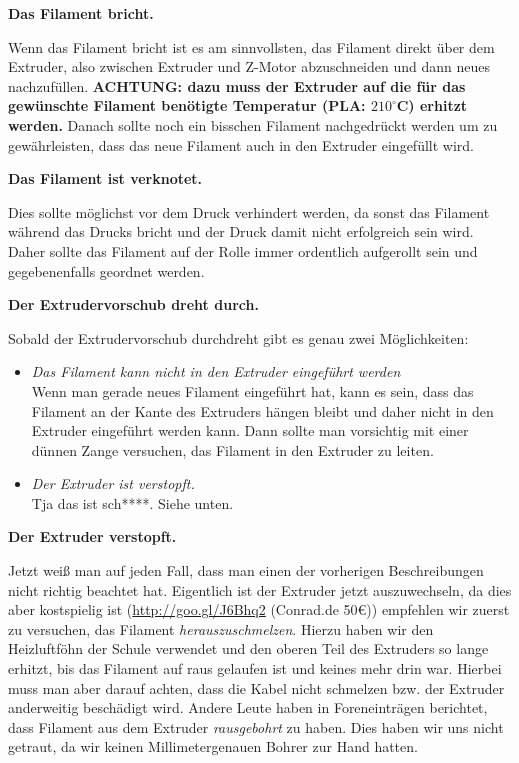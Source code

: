 \documentclass[11pt,a4paper]{scrartcl}
\begin{document}
\begin{description}
\item \textbf{Das Filament bricht.}\\
Wenn das Filament bricht ist es am sinnvollsten, das Filament direkt über dem Extruder, also zwischen Extruder und Z-Motor abzuschneiden und dann neues nachzufüllen. \textbf{ACHTUNG: dazu muss der Extruder auf die für das gewünschte Filament benötigte Temperatur (PLA: $210^\circ$C) erhitzt werden.} Danach sollte noch ein bisschen Filament nachgedrückt werden um zu gewährleisten, dass das neue Filament auch in den Extruder eingefüllt wird.

\item \textbf{Das Filament ist verknotet.}\\
Dies sollte möglichst vor dem Druck verhindert werden, da sonst das Filament während das Drucks bricht und der Druck damit nicht erfolgreich sein wird. Daher sollte das Filament auf der Rolle immer ordentlich aufgerollt sein und gegebenenfalls geordnet werden.

\item \textbf{Der Extrudervorschub dreht durch.}\\
Sobald der Extrudervorschub durchdreht gibt es genau zwei Möglichkeiten:
\begin{itemize}
\item \textit{Das Filament kann nicht in den Extruder eingeführt werden}\\
Wenn man gerade neues Filament eingeführt hat, kann es sein, dass das Filament an der Kante des Extruders hängen bleibt und daher nicht in den Extruder eingeführt werden kann. Dann sollte man vorsichtig mit einer dünnen Zange versuchen, das Filament in den Extruder zu leiten.
\item \textit{Der Extruder ist verstopft.}\\
Tja das ist sch****. Siehe unten.
\end{itemize}

\item \textbf{Der Extruder verstopft.}\\
Jetzt weiß man auf jeden Fall, dass man einen der vorherigen Beschreibungen nicht richtig beachtet hat. Eigentlich ist der Extruder jetzt auszuwechseln, da dies aber kostspielig ist (\url{http://goo.gl/J6Bhq2} (Conrad.de 50\euro)) empfehlen wir zuerst zu versuchen, das Filament \textit{herauszuschmelzen}. Hierzu haben wir den Heizluftföhn der Schule verwendet und den oberen Teil des Extruders so lange erhitzt, bis das Filament auf raus gelaufen ist und keines mehr drin war. Hierbei muss man aber darauf achten, dass die Kabel nicht schmelzen bzw. der Extruder anderweitig beschädigt wird. Andere Leute haben in Foreneinträgen berichtet, dass Filament aus dem Extruder \textit{rausgebohrt} zu haben. Dies haben wir uns nicht getraut, da wir keinen Millimetergenauen Bohrer zur Hand hatten.


\end{description}
\end{document}
